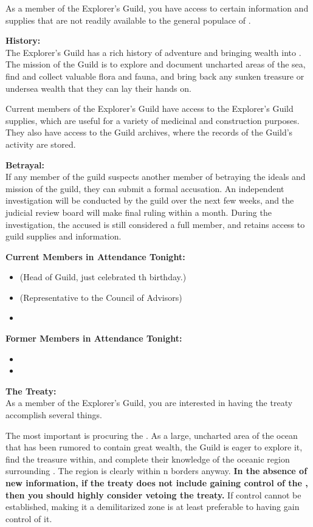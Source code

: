\documentclass[blue]{NeptuneBall}
\begin{document}
\name{\bExplorer{}}

As a member of the Explorer's Guild, you have access to certain information and supplies that are not readily available to the general populace of \pAtlantis{}.

{\bf History:}\\
The Explorer's Guild has a rich history of adventure and bringing wealth into \pAtlantis{}. The mission of the Guild is to explore and document uncharted areas of the sea, find and collect valuable flora and fauna, and bring back any sunken treasure or undersea wealth that they can lay their hands on.

Current members of the Explorer's Guild have access to the Explorer's Guild supplies, which are useful for a variety of medicinal and construction purposes. They also have access to the Guild archives, where the records of the Guild's activity are stored. 

{\bf Betrayal:}\\
If any member of the guild suspects another member of betraying the ideals and mission of the guild, they can submit a formal accusation. An independent investigation will be conducted by the guild over the next few weeks, and the judicial review board will make final ruling within a month. During the investigation, the accused is still considered a full member, and retains access to guild supplies and information.

{\bf Current Members in Attendance Tonight:}
\begin{itemize}
\item \cPlant{} (Head of Guild, just celebrated \cPlant{\their} \cOsiris{\MYnumber}th birthday.)
\item \cPriest{} (Representative to the Council of Advisors)
\item \cPrincess{}
\end{itemize}

{\bf Former Members in Attendance Tonight:}
\begin{itemize}
\item \cAriel{}
\item \cKing{}
\end{itemize}

{\bf The Treaty:}\\
As a member of the Explorer's Guild, you are interested in having the treaty accomplish several things. 

The most important is procuring the \pGazaStrip{}. As a large, uncharted area of the ocean that has been rumored to contain great wealth, the Guild is eager to explore it, find the treasure within, and complete their knowledge of the oceanic region surrounding \pAtlantis{}. The region is clearly within \pAtlantis{}n borders anyway. {\bf In the absence of new information, if the treaty does not include \pAtlantis{} gaining control of the \pGazaStrip{}, then you should highly consider vetoing the treaty.} If control cannot be established, making it a demilitarized zone is at least preferable to having \pPacifica{} gain control of it.
\end{document}
